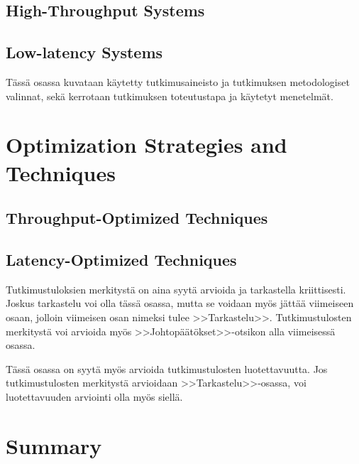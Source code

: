 \documentclass[english,12pt,a4paper,pdftex,sci,utf8]{aaltothesis}
\begin{document}
\subsection{High-Throughput Systems}
\subsection{Low-latency Systems}

T\"ass\"a osassa kuvataan k\"aytetty tutkimusaineisto ja
tutkimuksen metodologiset valinnat, sek\"a
kerrotaan tutkimuksen toteutustapa ja k\"aytetyt menetelm\"at. 

\clearpage

\section{Optimization Strategies and Techniques} \label{sec:optimization}
\subsection{Throughput-Optimized Techniques}
\subsection{Latency-Optimized Techniques}


Tutkimustuloksien merkityst\"a on aina syyt\"a arvioida ja tarkastella
kriittisesti.  Joskus tarkastelu voi olla t\"ass\"a osassa, mutta se
voidaan my\"os j\"att\"a\"a viimeiseen osaan, jolloin viimeisen osan nimeksi
tulee >>Tarkastelu>>. Tutkimustulosten merkityst\"a voi arvioida my\"os
>>Johtop\"a\"at\"okset>>-otsikon alla viimeisess\"a osassa. 

T\"ass\"a osassa on syyt\"a my\"os arvioida tutkimustulosten luotettavuutta.
Jos tutkimustulosten merkityst\"a arvioidaan >>Tarkastelu>>-osassa,
voi luotettavuuden arviointi olla my\"os siell\"a. 

\clearpage

\section{Summary} 
\end{document}
